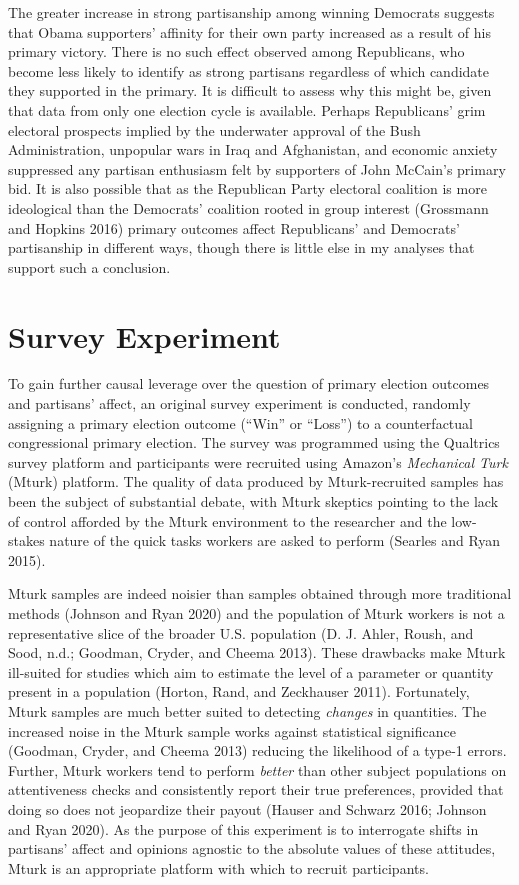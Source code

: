 \documentclass[
]{article}
\begin{document}
The greater increase in strong partisanship among winning Democrats suggests that Obama supporters' affinity for their own party increased as a result of his primary victory. There is no such effect observed among Republicans, who become less likely to identify as strong partisans regardless of which candidate they supported in the primary. It is difficult to assess why this might be, given that data from only one election cycle is available. Perhaps Republicans' grim electoral prospects implied by the underwater approval of the Bush Administration, unpopular wars in Iraq and Afghanistan, and economic anxiety suppressed any partisan enthusiasm felt by supporters of John McCain's primary bid. It is also possible that as the Republican Party electoral coalition is more ideological than the Democrats' coalition rooted in group interest (Grossmann and Hopkins 2016) primary outcomes affect Republicans' and Democrats' partisanship in different ways, though there is little else in my analyses that support such a conclusion.

\hypertarget{survey-experiment}{%
\section{Survey Experiment}\label{survey-experiment}}

To gain further causal leverage over the question of primary election outcomes and partisans' affect, an original survey experiment is conducted, randomly assigning a primary election outcome (``Win'' or ``Loss'') to a counterfactual congressional primary election. The survey was programmed using the Qualtrics survey platform and participants were recruited using Amazon's \emph{Mechanical Turk} (Mturk) platform. The quality of data produced by Mturk-recruited samples has been the subject of substantial debate, with Mturk skeptics pointing to the lack of control afforded by the Mturk environment to the researcher and the low-stakes nature of the quick tasks workers are asked to perform (Searles and Ryan 2015).

Mturk samples are indeed noisier than samples obtained through more traditional methods (Johnson and Ryan 2020) and the population of Mturk workers is not a representative slice of the broader U.S. population (D. J. Ahler, Roush, and Sood, n.d.; Goodman, Cryder, and Cheema 2013). These drawbacks make Mturk ill-suited for studies which aim to estimate the level of a parameter or quantity present in a population (Horton, Rand, and Zeckhauser 2011). Fortunately, Mturk samples are much better suited to detecting \emph{changes} in quantities. The increased noise in the Mturk sample works against statistical significance (Goodman, Cryder, and Cheema 2013) reducing the likelihood of a type-1 errors. Further, Mturk workers tend to perform \emph{better} than other subject populations on attentiveness checks and consistently report their true preferences, provided that doing so does not jeopardize their payout (Hauser and Schwarz 2016; Johnson and Ryan 2020). As the purpose of this experiment is to interrogate shifts in partisans' affect and opinions agnostic to the absolute values of these attitudes, Mturk is an appropriate platform with which to recruit participants.
\end{document}
